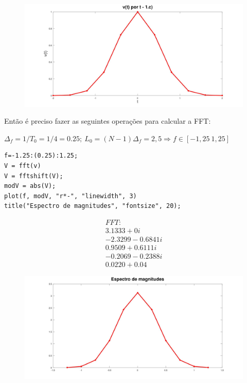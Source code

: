 \documentclass[10pt]{article}
\begin{document}
\begin{figure}[h]
    \includegraphics[scale=0.2]{questao1c}
    \centering
\end{figure}

Então é preciso fazer as seguintes operações para calcular a FFT:

$\Delta_f = 1/T_0 = 1/4 = 0.25; \ L_0 = (N - 1)\Delta_f = 2,5 \Rightarrow f \in [-1,25 \ 1,25]$

\begin{verbatim}
f=-1.25:(0.25):1.25;
V = fft(v)
V = fftshift(V);
modV = abs(V);
plot(f, modV, "r*-", "linewidth", 3)
title("Espectro de magnitudes", "fontsize", 20);
\end{verbatim}

\begin{align*}
    FFT: \\
    3.1333 +      0i \\
    -2.3299 - 0.6841i \\
    0.9509 + 0.6111i \\
    -0.2069 - 0.2388i \\
    0.0220 + 0.04
\end{align*}

\begin{figure}[h]
    \includegraphics[scale=0.2]{questao1c2}
    \centering
\end{figure}
\end{document}
